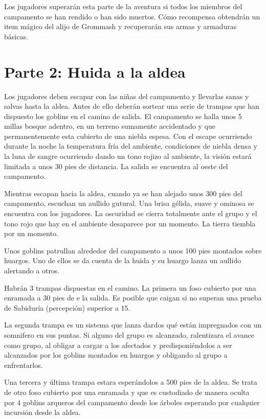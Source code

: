 \documentclass[10pt,twoside,twocolumn,openany]{dndbook}
\begin{document}
Los jugadores superarán esta parte de la aventura si todos los miembros del campamento se han rendido 
o han sido muertos. Cómo recompensa obtendrán un item mágico del alijo de Grommash y recuperarán sus 
armas y armaduras básicas.


\section*{Parte 2: Huida a la aldea}

Los jugadores deben escapar con las niñas del campamento y llevarlas sanas y salvas hasta la aldea. 
Antes de ello deberán sortear una serie de trampas que han dispuesto los goblins en el camino de salida. 
El campamento se halla unos 5 millas bosque adentro, en un terreno sumamente accidentado y que 
permanentemente esta cubierto de una niebla espesa. Con el escape ocurriendo durante la noche 
la temperatura fría del ambiente, condiciones de niebla densa y la luna de sangre ocurriendo dando 
un tono rojizo al ambiente, la visión estará limitada a unos 30 pies de distancia. La salida se 
encuentra al oeste del campamento.

\begin{DndReadAloud}
Mientras escapan hacia la aldea, cuando ya se han alejado unos 300 pies del campamento, escuchan 
un aullido gutural. Una brisa gélida, suave y ominosa se encuentra con los jugadores. La oscuridad
se cierra totalmente ante el grupo y el tono rojo que hay en el ambiente desaparece por un momento.
La tierra tiembla por un momento.
\end{DndReadAloud}

Unos goblins patrullan alrededor del campamento a unos 100 pies montados sobre huargos. Uno de ellos
se da cuenta de la huida y su huargo lanza un aullido alertando a otros.

Habrán 3 trampas dispuestas en el camino. La primera un foso cubierto por una enramada a 30 pies de e
la salida. Es posible que caigan si no superan una prueba de Sabiduría (percepción) superior a 15.

La segunda trampa es un sistema que lanza dardos qué están impregnados con un somnifero en sus puntas. 
Si alguno del grupo es alcanzado, ralentizara el avance como grupo, al obligar a cargar a los afectados 
y predisponiéndolos a ser alcanzados por los goblins montados en huargos y obligando al grupo a 
enfrentarlos.

Una tercera y última trampa estara esperándolos a 500 pies de la aldea. Se trata de otro foso cubierto
por una enramada y que es custodiado de manera oculta por 4 goblins arqueros del campamento desde los 
árboles esperando por cualquier incursión desde la aldea. 
\end{document}
